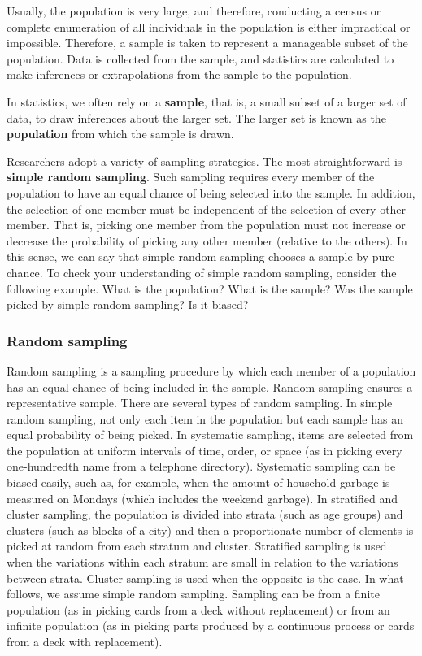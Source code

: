 \documentclass[
  12pt,
  oneside]{book}
\theoremstyle{definition}
\theoremstyle{definition}
\theoremstyle{definition}
\theoremstyle{definition}
\theoremstyle{remark}
\begin{document}
Usually, the population is very large, and therefore, conducting a census or complete enumeration of all individuals in the population is either impractical or impossible. Therefore, a sample is taken to represent a manageable subset of the population. Data is collected from the sample, and statistics are calculated to make inferences or extrapolations from the sample to the population.

In statistics, we often rely on a \textbf{sample}, that is, a small subset of a larger set of
data, to draw inferences about the larger set. The larger set is known as the
\textbf{population} from which the sample is drawn.

Researchers adopt a variety of sampling strategies. The most straightforward is
\textbf{simple random sampling}. Such sampling requires every member of the population
to have an equal chance of being selected into the sample. In addition, the selection
of one member must be independent of the selection of every other member. That
is, picking one member from the population must not increase or decrease the
probability of picking any other member (relative to the others). In this sense, we
can say that simple random sampling chooses a sample by pure chance. To check
your understanding of simple random sampling, consider the following example.
What is the population? What is the sample? Was the sample picked by simple
random sampling? Is it biased?

\hypertarget{random-sampling}{%
\subsubsection{Random sampling}\label{random-sampling}}

Random sampling is a sampling procedure by which each member of a population has an equal chance of being included in the sample. Random sampling ensures a representative sample. There are several types of random sampling. In simple random sampling, not only each item in the population but each sample has an equal probability of being picked. In systematic sampling, items are selected from the population at uniform intervals of time, order, or space (as in picking every one-hundredth name from a telephone directory). Systematic sampling can be biased easily, such as, for example, when the amount of household garbage is measured on Mondays (which includes the weekend garbage). In stratified and cluster sampling, the population is divided into strata (such as age groups) and clusters (such as blocks of a city) and then a proportionate number of elements is picked at random from each stratum and cluster. Stratified sampling is used when the variations within each stratum are small in relation to the variations between strata. Cluster sampling is used when the opposite is the case. In what follows, we assume simple random sampling. Sampling can be from a finite population (as in picking cards from a deck without replacement) or from an infinite population (as in picking parts produced by a continuous process or cards from a deck with replacement).
\end{document}
